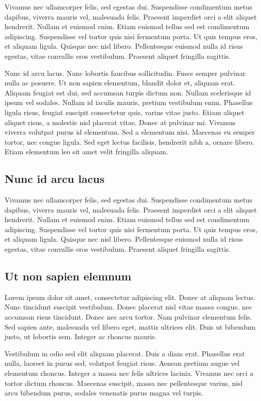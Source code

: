 Vivamus nec ullamcorper felis, sed egestas dui. Suspendisse condimentum metus dapibus, viverra mauris vel, malesuada felis. Praesent imperdiet orci a elit aliquet hendrerit. Nullam et euismod enim. Etiam euismod tellus sed est condimentum adipiscing. Suspendisse vel tortor quis nisi fermentum porta. Ut quis tempus eros, et aliquam ligula. Quisque nec nisl libero. Pellentesque euismod nulla id risus egestas, vitae convallis eros vestibulum. Praesent aliquet fringilla sagittis.

Nunc id arcu lacus. Nunc lobortis faucibus sollicitudin. Fusce semper pulvinar nulla ac posuere. Ut non sapien elementum, blandit dolor et, aliquam erat. Aliquam feugiat est dui, sed accumsan turpis dictum non. Nullam scelerisque id ipsum vel sodales. Nullam id iaculis mauris, pretium vestibulum enim. Phasellus ligula risus, feugiat suscipit consectetur quis, varius vitae justo. Etiam aliquet aliquet risus, a molestie nisl placerat vitae. Donec at pulvinar mi. Vivamus viverra volutpat purus id elementum. Sed a elementum nisi. Maecenas eu semper tortor, nec congue ligula. Sed eget lectus facilisis, hendrerit nibh a, ornare libero. Etiam elementum leo sit amet velit fringilla aliquam.

\subsection{Nunc id arcu lacus}

Vivamus nec ullamcorper felis, sed egestas dui. Suspendisse condimentum metus dapibus, viverra mauris vel, malesuada felis. Praesent imperdiet orci a elit aliquet hendrerit. Nullam et euismod enim. Etiam euismod tellus sed est condimentum adipiscing. Suspendisse vel tortor quis nisi fermentum porta. Ut quis tempus eros, et aliquam ligula. Quisque nec nisl libero. Pellentesque euismod nulla id risus egestas, vitae convallis eros vestibulum. Praesent aliquet fringilla sagittis.

\subsection{Ut non sapien elemnum}

Lorem ipsum dolor sit amet, consectetur adipiscing elit. Donec at aliquam lectus. Nunc tincidunt suscipit vestibulum. Donec placerat nisl vitae massa congue, nec accumsan risus tincidunt. Donec nec arcu tortor. Nam pulvinar elementum felis. Sed sapien ante, malesuada vel libero eget, mattis ultrices elit. Duis ut bibendum justo, ut lobortis sem. Integer ac rhoncus mauris.

Vestibulum in odio sed elit aliquam placerat. Duis a diam erat. Phasellus erat nulla, laoreet in purus sed, volutpat feugiat risus. Aenean pretium augue vel elementum rhoncus. Integer a massa nec felis ultrices lacinia. Vivamus nec orci a tortor dictum rhoncus. Maecenas suscipit, massa nec pellentesque varius, nisl arcu bibendum purus, sodales venenatis purus magna vel turpis.